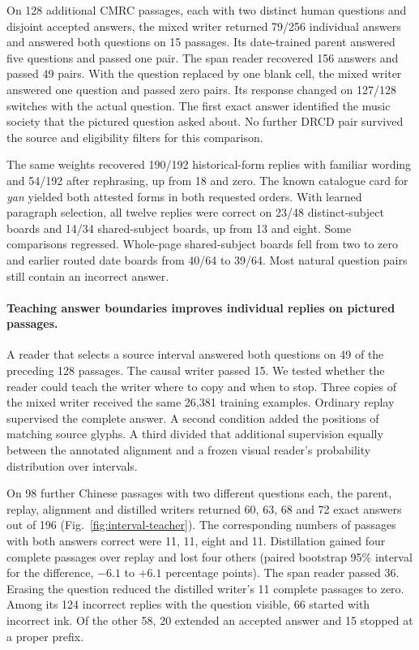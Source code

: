 \documentclass[12pt,a4paper]{article}
\providecommand{\DIFadd}[1]{{\protect\color{blue} \sf #1}} %
\begin{document}
\DIFadd{On 128 additional CMRC passages, each with two distinct human questions and disjoint accepted answers, the mixed writer returned 79/256 individual answers and answered both questions on 15 passages. Its date-trained parent answered five questions and passed one pair. The span reader recovered 156 answers and passed 49 pairs. With the question replaced by one blank cell, the mixed writer answered one question and passed zero pairs. Its response changed on 127/128 switches with the actual question. The first exact answer identified the music society that the pictured question asked about. No further DRCD pair survived the source and eligibility filters for this comparison.
}

\DIFadd{The same weights recovered 190/192 historical-form replies with familiar wording and 54/192 after rephrasing, up from 18 and zero. The known catalogue card for \textit{yan} yielded both attested forms in both requested orders. With learned paragraph selection, all twelve replies were correct on 23/48 distinct-subject boards and 14/34 shared-subject boards, up from 13 and eight. Some comparisons regressed. Whole-page shared-subject boards fell from two to zero and earlier routed date boards from 40/64 to 39/64. Most natural question pairs still contain an incorrect answer.
}

\paragraph{\DIFadd{Teaching answer boundaries improves individual replies on pictured passages.}}
\DIFadd{A reader that selects a source interval answered both questions on 49 of the preceding 128 passages. The causal writer passed 15. We tested whether the reader could teach the writer where to copy and when to stop. Three copies of the mixed writer received the same 26,381 training examples. Ordinary replay supervised the complete answer. A second condition added the positions of matching source glyphs. A third divided that additional supervision equally between the annotated alignment and a frozen visual reader's probability distribution over intervals.
}

\DIFadd{On 98 further Chinese passages with two different questions each, the parent, replay, alignment and distilled writers returned 60, 63, 68 and 72 exact answers out of 196 (Fig.~\ref{fig:interval-teacher}). The corresponding numbers of passages with both answers correct were 11, 11, eight and 11. Distillation gained four complete passages over replay and lost four others (paired bootstrap 95\% interval for the difference, $-6.1$ to $+6.1$ percentage points). The span reader passed 36. Erasing the question reduced the distilled writer's 11 complete passages to zero. Among its 124 incorrect replies with the question visible, 66 started with incorrect ink. Of the other 58, 20 extended an accepted answer and 15 stopped at a proper prefix.
}
\end{document}
